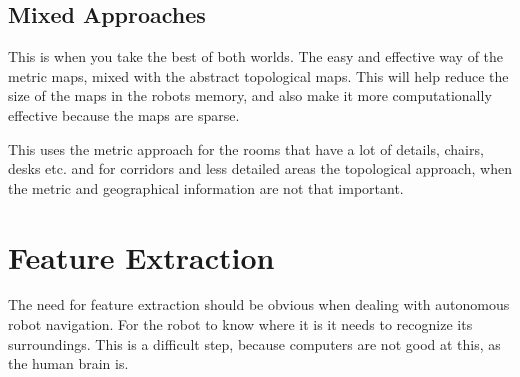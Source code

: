 \subsection{Mixed Approaches}
This is when you take the best of both worlds. The easy and effective way of the metric
maps, mixed with the abstract topological maps. This will help reduce the size of
the maps in the robots memory, and also make it more computationally effective because the
maps are sparse. 

This uses 
the metric approach for the rooms that have a lot of details, chairs, desks etc. and for
corridors and less detailed areas the topological approach, when the metric and
geographical information are not that important. 
\cite{thrun}










\section{Feature Extraction}
\label{chap2:sec-feature-extraction}
The need for feature extraction should be obvious when dealing with autonomous robot
navigation. For the robot to know where it is it needs to recognize its surroundings. This
is a difficult step, because computers are not good at this, as the human
brain is. 

